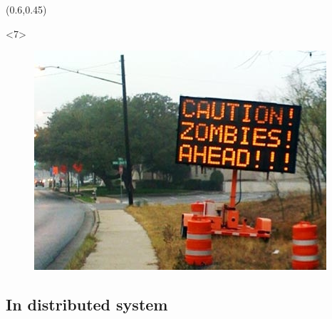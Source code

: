 \documentclass{beamer}
\begin{document}
\begin{frame}
\begin{textblock*}{50mm}
\begin{exampleblock}{}
\begin{figure}
            \end{figure}
        \end{exampleblock}
    \end{textblock*}
    \begin{textblock*}{50mm}(0.6\textwidth,0.45\textheight)
        \begin{exampleblock}{}<7>
            \begin{figure}
                \includegraphics[width=\textwidth]{imgs/aux/zombies-ahead_hack.jpg}
            \end{figure}
        \end{exampleblock}
    \end{textblock*}
\end{frame}

\subsection{In distributed system}
\end{document}
